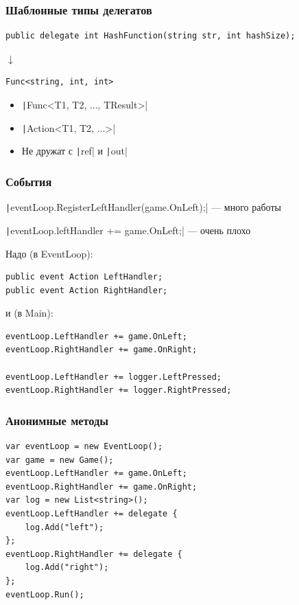 \documentclass{../../slides-style}
\begin{document}
    \begin{frame}[fragile]
        \frametitle{Шаблонные типы делегатов}
        \begin{verbatim}
public delegate int HashFunction(string str, int hashSize);
        \end{verbatim}
        \hspace{2cm}\begin{Large}$\downarrow$\end{Large}
        \begin{verbatim}
Func<string, int, int>
        \end{verbatim}
        \begin{itemize}
            \item \texttt|Func<T1, T2, ..., TResult>|
            \item \texttt|Action<T1, T2, ...>|
            \item Не дружат с \texttt|ref| и \texttt|out|
        \end{itemize}
    \end{frame}

    \begin{frame}[fragile]
        \frametitle{События}
        \texttt|eventLoop.RegisterLeftHandler(game.OnLeft);| --- много работы

        \texttt|eventLoop.leftHandler += game.OnLeft;| --- очень плохо

        \vspace{3mm}
        Надо (в EventLoop):
        \begin{verbatim}
public event Action LeftHandler;
public event Action RightHandler;
        \end{verbatim}
        \vspace{3mm}
        и (в Main):
        \begin{verbatim}
eventLoop.LeftHandler += game.OnLeft;
eventLoop.RightHandler += game.OnRight;

eventLoop.LeftHandler += logger.LeftPressed;
eventLoop.RightHandler += logger.RightPressed;
        \end{verbatim}
    \end{frame}

    \begin{frame}[fragile]
        \frametitle{Анонимные методы}
        \begin{verbatim}
var eventLoop = new EventLoop();
var game = new Game();
eventLoop.LeftHandler += game.OnLeft;
eventLoop.RightHandler += game.OnRight;
var log = new List<string>();
eventLoop.LeftHandler += delegate {
    log.Add("left");
};
eventLoop.RightHandler += delegate {
    log.Add("right");
};
eventLoop.Run();
        \end{verbatim}
    \end{frame}
\end{document}
